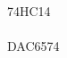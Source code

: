 \begin{spacing}{1.5}
\pagebreak
\begin{multicols}{3}
74HC14\\
\\
DAC6574\\

\end{multicols}
\end{spacing}
